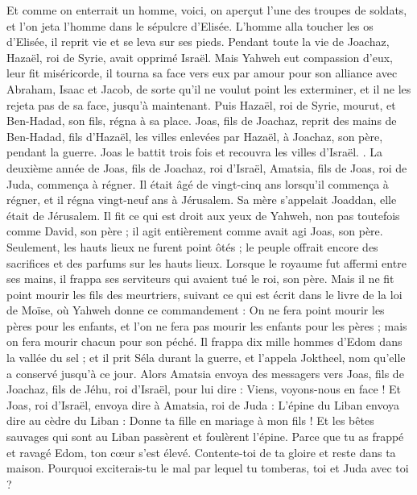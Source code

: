 \begin{multicols}{2}
Et comme on enterrait un homme, voici, on aperçut l'une des troupes de soldats, et l'on jeta l'homme dans le sépulcre d'Elisée. L'homme alla toucher les os d'Elisée, il reprit vie et se leva sur ses pieds.
Pendant toute la vie de Joachaz, Hazaël, roi de Syrie, avait opprimé Israël.
Mais Yahweh eut compassion d'eux, leur fit miséricorde, il tourna sa face vers eux par amour pour son alliance avec Abraham, Isaac et Jacob, de sorte qu'il ne voulut point les exterminer, et il ne les rejeta pas de sa face, jusqu'à maintenant.
Puis Hazaël, roi de Syrie, mourut, et Ben-Hadad, son fils, régna à sa place.
Joas, fils de Joachaz, reprit des mains de Ben-Hadad, fils d'Hazaël, les villes enlevées par Hazaël, à Joachaz, son père, pendant la guerre. Joas le battit trois fois et recouvra les villes d'Israël.
.
\VerseOne{}La deuxième année de Joas, fils de Joachaz, roi d'Israël, Amatsia, fils de Joas, roi de Juda, commença à régner.
Il était âgé de vingt-cinq ans lorsqu'il commença à régner, et il régna vingt-neuf ans à Jérusalem. Sa mère s'appelait Joaddan, elle était de Jérusalem.
Il fit ce qui est droit aux yeux de Yahweh, non pas toutefois comme David, son père ; il agit entièrement comme avait agi Joas, son père.
Seulement, les hauts lieux ne furent point ôtés ; le peuple offrait encore des sacrifices et des parfums sur les hauts lieux.
Lorsque le royaume fut affermi entre ses mains, il frappa ses serviteurs qui avaient tué le roi, son père.
Mais il ne fit point mourir les fils des meurtriers, suivant ce qui est écrit dans le livre de la loi de Moïse, où Yahweh donne ce commandement : On ne fera point mourir les pères pour les enfants, et l'on ne fera pas mourir les enfants pour les pères ; mais on fera mourir chacun pour son péché.
Il frappa dix mille hommes d'Edom dans la vallée du sel ; et il prit Séla durant la guerre, et l'appela Joktheel, nom qu'elle a conservé jusqu'à ce jour.
Alors Amatsia envoya des messagers vers Joas, fils de Joachaz, fils de Jéhu, roi d'Israël, pour lui dire : Viens, voyons-nous en face !
Et Joas, roi d'Israël, envoya dire à Amatsia, roi de Juda : L'épine du Liban envoya dire au cèdre du Liban : Donne ta fille en mariage à mon fils ! Et les bêtes sauvages qui sont au Liban passèrent et foulèrent l'épine.
Parce que tu as frappé et ravagé Edom, ton cœur s'est élevé. Contente-toi de ta gloire et reste dans ta maison. Pourquoi exciterais-tu le mal par lequel tu tomberas, toi et Juda avec toi ?

\end{multicols}
